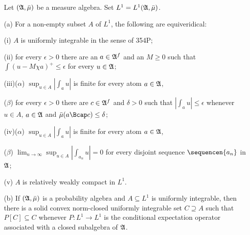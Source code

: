  Let $(\frak A,\bar\mu)$ be a measure algebra.
Set $L^1=L^1(\frak A,\bar\mu)$.

(a) For a non-empty subset $A$ of $L^1$, the following are equiveridical:

\quad(i) $A$ is uniformly integrable in the sense of 354P;

\quad(ii) for every $\epsilon>0$ there are an $a\in\frak A^f$ and an 
$M\ge 0$ such that $\int(u-M\chi a)^+\le\epsilon$ for every $u\in\frak A$;

\quad(iii)($\alpha$) 
$\sup_{u\in A}|\int_au|$ is finite for every atom $a\in\frak A$,

\qquad($\beta$) for every $\epsilon>0$ there are $c\in\frak A^f$ and
$\delta>0$ such that $|\int_au|\le\epsilon$ whenever $u\in A$,
$a\in\frak A$ and $\bar\mu(a\Bcap c)\le\delta$;

\quad(iv)($\alpha$) 
$\sup_{u\in A}|\int_au|$ is finite for every atom $a\in\frak A$,

\qquad($\beta$) $\lim_{n\to\infty}\sup_{u\in A}|\int_{a_n}u|=0$ for
every disjoint sequence $\sequencen{a_n}$ in $\frak A$;

\quad(v) $A$ is relatively weakly compact in $L^1$.

(b) If $(\frak A,\bar\mu)$ is a probability algebra and $A\subseteq L^1$  
is uniformly integrable, then there is a solid convex norm-closed uniformly
integrable set $C\supseteq A$ such that $P[C]\subseteq C$ whenever
$P:L^1\to L^1$ is the conditional expectation operator associated with a
closed subalgebra of $\frak A$.

     
